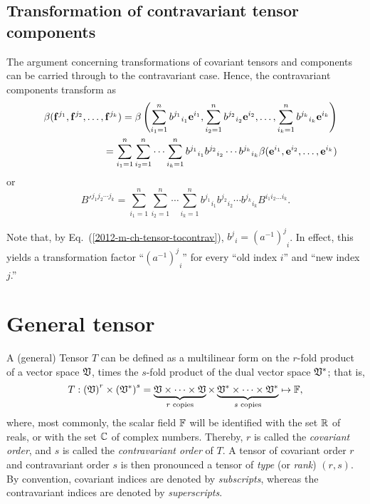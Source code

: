 \subsection{Transformation of contravariant tensor components}

The argument concerning transformations of covariant tensors and components
can be carried through to the contravariant case.
Hence, the contravariant components transform as
\begin{eqnarray}
&&\beta ( {{\bf f}}^{j_1},{{\bf f}}^{j_2},\ldots ,{{\bf f}}^{j_k})=
\beta \left(
\sum_{i_1=1}^n {b^{j_1}}_{i_1} {\bf e}^{i_1},
\sum_{i_2=1}^n {b^{j_2}}_{i_2} {\bf e}^{i_2},
\ldots ,
\sum_{i_k=1}^n {b^{j_k}}_{i_k} {\bf e}^{i_k}
\right)
\nonumber \\&& \quad
=
\sum_{i_1=1}^n\sum_{i_2=1}^n\cdots \sum_{i_k=1}^n
{b^{j_1}}_{i_1}{b^{j_2}}_{i_2}\cdots {b^{j_k}}_{i_k} \beta ( {\bf e}^{i_1},{\bf e}^{i_2},\ldots ,{\bf e}^{i_k})
 \label{2012-m-ch-tensor-etotccon1}
\end{eqnarray}
or
\begin{equation}
B'^{{j_1}{j_2}\cdots {j_k}}=
\sum_{i_1=1}^n\sum_{i_2=1}^n\cdots \sum_{i_k=1}^n
{b^{j_1}}_{i_1}{b^{j_2}}_{i_2}\cdots {b^{j_k}}_{i_k} B^{i_1 i_2\ldots i_k}.
 \label{2012-m-ch-tensor-etotccon2}
\end{equation}

Note that, by Eq.~(\ref{2012-m-ch-tensor-tocontrav}),
$ {b^j}_i =  {\left( a^{-1} \right)^j}_i$.
%
In effect, this yields a transformation factor ``${\left( a^{-1} \right)^j}_i$'' for every ``old index $i$'' and ``new index $j$.''


\section{General tensor}

A (general) Tensor $T$ can be defined as a multilinear form  on the
$r$-fold product of a vector space ${\frak V}$, times the
$s$-fold product of the dual vector space ${\frak V}^\ast$;
that is,
\begin{equation}
T: \left( {\frak V} \right)^r \times \left( {\frak V}^\ast \right)^s
=
\underbrace{{\frak V}\times \cdots \times {\frak V}}_{r\textrm{ \scriptsize copies}}
\times
\underbrace{{\frak V}^\ast \times \cdots \times {\frak V}^\ast}_{s\textrm{ \scriptsize copies}}
\mapsto {\Bbb F}
,
 \label{2012-m-ch-tensor-gdt}
\end{equation}
where, most commonly, the scalar field
${\Bbb F}$
will be identified with the set ${\Bbb R}$ of reals,
or with the set ${\Bbb C}$ of complex numbers.
Thereby,
$r$ is called the
{\em covariant order}, and
$s$ is called the
{\em contravariant order}
of $T$.
A tensor of covariant order $r$ and contravariant order $s$
is then pronounced a tensor of
{\em type} (or {\em rank})
$(r,s)$.
By convention, covariant indices are denoted by {\em subscripts},
whereas the contravariant indices are denoted by {\em superscripts}.

